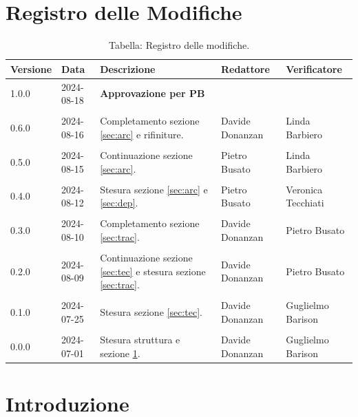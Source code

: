 \documentclass[8pt]{article}
\begin{document}
\section*{Registro delle Modifiche}
\begin{table}[ht!]	
	\centering
	\begin{tabular}{p{1.2cm} p{2cm} p{5cm} p{3cm} p{3cm}}
		\toprule
		\textbf{Versione}& \textbf{Data} & \textbf{Descrizione} & \textbf{Redattore} & \textbf{Verificatore} \\
		\midrule
            1.0.0 & 2024-08-18 & \textbf{Approvazione per PB} &  & \\\\
  		    0.6.0 & 2024-08-16 & Completamento sezione \ref{sec:arc} e rifiniture. & Davide Donanzan &  Linda Barbiero \\\\
  		    0.5.0 & 2024-08-15 & Continuazione sezione \ref{sec:arc}. & Pietro Busato & Linda Barbiero \\\\
  		    0.4.0 & 2024-08-12 & Stesura sezione \ref{sec:arc} e \ref{sec:dep}. & Pietro Busato & Veronica Tecchiati \\\\
  		    0.3.0 & 2024-08-10 & Completamento sezione \ref{sec:trac}. & Davide Donanzan & Pietro Busato \\\\
  		    0.2.0 & 2024-08-09 & Continuazione sezione \ref{sec:tec} e stesura sezione \ref{sec:trac}. & Davide Donanzan & Pietro Busato \\\\
		    0.1.0 & 2024-07-25 & Stesura sezione \ref{sec:tec}. & Davide Donanzan & Guglielmo Barison \\\\
    		0.0.0 & 2024-07-01 & Stesura struttura e sezione \ref{sec:intro}. & Davide Donanzan & Guglielmo Barison \\
		\bottomrule
	\end{tabular}
	\caption*{Tabella: Registro delle modifiche.}
	\label{table:Registro delle modifiche}
\end{table}
\newpage
\tableofcontents
\newpage
\listoffigures
\newpage
\listoftables
\newpage
\justifying
\section{Introduzione}\label{sec:intro}
\end{document}
